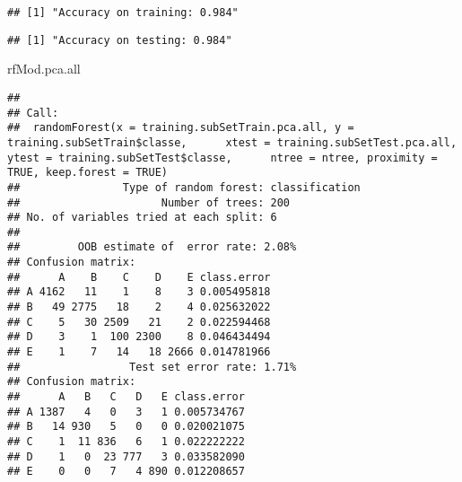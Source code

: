 \documentclass[]{article}
\newenvironment{Shaded}{\begin{snugshade}}{\end{snugshade}}
\newcommand{\DecValTok}[1]{\textcolor[rgb]{0.00,0.00,0.81}{#1}}
\newcommand{\KeywordTok}[1]{\textcolor[rgb]{0.13,0.29,0.53}{\textbf{#1}}}
\newcommand{\NormalTok}[1]{#1}
\newcommand{\OperatorTok}[1]{\textcolor[rgb]{0.81,0.36,0.00}{\textbf{#1}}}
\newcommand{\StringTok}[1]{\textcolor[rgb]{0.31,0.60,0.02}{#1}}
\begin{document}
\begin{Shaded}
\end{Shaded}

\begin{verbatim}
## [1] "Accuracy on training: 0.984"
\end{verbatim}

\begin{Shaded}
\end{Shaded}

\begin{verbatim}
## [1] "Accuracy on testing: 0.984"
\end{verbatim}

\begin{Shaded}
\begin{Highlighting}[]
\NormalTok{rfMod.pca.all}
\end{Highlighting}
\end{Shaded}

\begin{verbatim}
## 
## Call:
##  randomForest(x = training.subSetTrain.pca.all, y = training.subSetTrain$classe,      xtest = training.subSetTest.pca.all, ytest = training.subSetTest$classe,      ntree = ntree, proximity = TRUE, keep.forest = TRUE) 
##                Type of random forest: classification
##                      Number of trees: 200
## No. of variables tried at each split: 6
## 
##         OOB estimate of  error rate: 2.08%
## Confusion matrix:
##      A    B    C    D    E class.error
## A 4162   11    1    8    3 0.005495818
## B   49 2775   18    2    4 0.025632022
## C    5   30 2509   21    2 0.022594468
## D    3    1  100 2300    8 0.046434494
## E    1    7   14   18 2666 0.014781966
##                 Test set error rate: 1.71%
## Confusion matrix:
##      A   B   C   D   E class.error
## A 1387   4   0   3   1 0.005734767
## B   14 930   5   0   0 0.020021075
## C    1  11 836   6   1 0.022222222
## D    1   0  23 777   3 0.033582090
## E    0   0   7   4 890 0.012208657
\end{verbatim}
\end{document}
